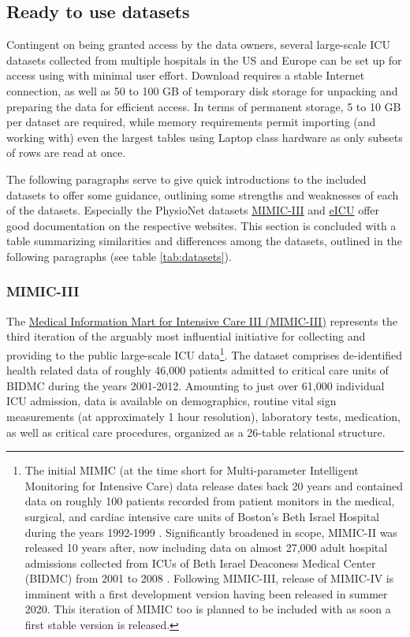 \documentclass[
  notitle]{jss}
\begin{document}
\hypertarget{ready-to-use-datasets}{%
\subsection{Ready to use datasets}\label{ready-to-use-datasets}}

Contingent on being granted access by the data owners, several
large-scale ICU datasets collected from multiple hospitals in the US and
Europe can be set up for access using  with minimal user
effort. Download requires a stable Internet connection, as well as 50 to
100 GB of temporary disk storage for unpacking and preparing the data
for efficient access. In terms of permanent storage, 5 to 10 GB per
dataset are required, while memory requirements permit importing (and
working with) even the largest tables using Laptop class hardware as
only subsets of rows are read at once.

The following paragraphs serve to give quick introductions to the
included datasets to offer some guidance, outlining some strengths and
weaknesses of each of the datasets. Especially the PhysioNet datasets
\href{https://mimic.physionet.org/about/mimic/}{MIMIC-III} and
\href{https://eicu-crd.mit.edu/about/eicu/}{eICU} offer good
documentation on the respective websites. This section is concluded with
a table summarizing similarities and differences among the datasets,
outlined in the following paragraphs (see table \ref{tab:datasets}).

\hypertarget{mimic-iii}{%
\subsubsection{MIMIC-III}\label{mimic-iii}}

The \href{https://physionet.org/content/mimiciii/1.4/}{Medical
Information Mart for Intensive Care III (MIMIC-III)} represents the
third iteration of the arguably most influential initiative for
collecting and providing to the public large-scale ICU data\footnote{The
  initial MIMIC (at the time short for Multi-parameter Intelligent
  Monitoring for Intensive Care) data release dates back 20 years and
  contained data on roughly 100 patients recorded from patient monitors
  in the medical, surgical, and cardiac intensive care units of Boston's
  Beth Israel Hospital during the years 1992-1999 \citep{moody1996}.
  Significantly broadened in scope, MIMIC-II was released 10 years
  after, now including data on almost 27,000 adult hospital admissions
  collected from ICUs of Beth Israel Deaconess Medical Center (BIDMC)
  from 2001 to 2008 \citep{lee2011}. Following MIMIC-III, release of
  MIMIC-IV is imminent with a first development version having been
  released in summer 2020. This iteration of MIMIC too is planned to be
  included with  as soon a first stable version is released.}.
The dataset comprises de-identified health related data of roughly
46,000 patients admitted to critical care units of BIDMC during the
years 2001-2012. Amounting to just over 61,000 individual ICU admission,
data is available on demographics, routine vital sign measurements (at
approximately 1 hour resolution), laboratory tests, medication, as well
as critical care procedures, organized as a 26-table relational
structure.
\end{document}
